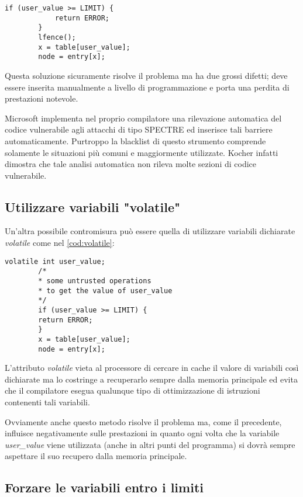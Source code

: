 		\begin{lstlisting}[caption={Utilizzo di lfence},label={list:lfence}]
		if (user_value >= LIMIT) {
			return ERROR;
		} 
		lfence(); 
		x = table[user_value]; 
		node = entry[x];
		\end{lstlisting} 
		
		Questa soluzione sicuramente risolve il problema ma ha due grossi difetti; deve essere inserita manualmente a livello di programmazione e porta una perdita di prestazioni notevole\cite{AMD2018speculation}.
		
		Microsoft implementa nel proprio compilatore una rilevazione automatica del codice vulnerabile agli attacchi di tipo SPECTRE ed inserisce tali barriere automaticamente. Purtroppo la blacklist di questo strumento comprende solamente le situazioni più comuni e maggiormente utilizzate. Kocher infatti dimostra che tale analisi automatica non rileva molte sezioni di codice vulnerabile\cite{kocher2018mitigation}.
		
		\subsection*{Utilizzare variabili "volatile"}
		
		Un'altra possibile contromisura può essere quella di utilizzare variabili dichiarate \emph{volatile} come nel \cref{cod:volatile}:
		
		\begin{lstlisting}[caption={Utilizzo di variabili dichiarate volatile},label={cod:volatile}]
		volatile int user_value;
		/*
		* some untrusted operations 
		* to get the value of user_value
		*/
		if (user_value >= LIMIT) {
		return ERROR;
		} 
		x = table[user_value]; 
		node = entry[x];
		\end{lstlisting}
		
		L'attributo \emph{volatile} vieta al processore di cercare in cache il valore di variabili così dichiarate ma lo costringe a recuperarlo sempre dalla memoria principale ed evita che il compilatore esegua qualunque tipo di ottimizzazione di istruzioni contenenti tali variabili.
				
		Ovviamente anche questo metodo risolve il problema ma, come il precedente, influisce negativamente sulle prestazioni in quanto ogni volta che la variabile \emph{user\_value} viene utilizzata (anche in altri punti del programma) si dovrà sempre aspettare il suo recupero dalla memoria principale.
		
		\subsection*{Forzare le variabili entro i limiti}
		
